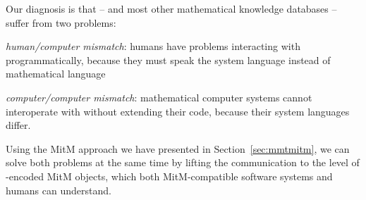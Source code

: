 Our diagnosis is that {\lmfdb} -- and most other mathematical knowledge databases -- suffer from two problems:
\begin{compactitem}
\item \emph{human/computer mismatch}: humans have problems interacting with \lmfdb programmatically, because they must speak the system language instead of mathematical language
\item \emph{computer/computer mismatch}: mathematical computer systems cannot interoperate with \lmfdb without extending their code, because their system languages differ.
\end{compactitem}
Using the MitM approach we have presented in Section~\ref{sec:mmtmitm}, we can solve both problems at the same time by lifting the communication to the level of \ommt-encoded MitM objects, which both MitM-compatible software systems and humans can understand.

